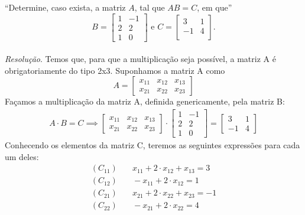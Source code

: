 \enquote{Determine, caso exista, a matriz $A$, tal que $AB = C$, em que}
\begin{displaymath}
B = \left[\begin{array}{ccc}
    1 & -1 \\
    2 & 2 \\
    1 & 0
\end{array} \right]
\text{ e }
C = \left[\begin{array}{cc}
    3 & 1 \\
    -1 & 4 \\
\end{array} \right].
\end{displaymath}
\\ 
\emph{Resolução}. Temos que, para que a multiplicação seja possível, a matriz A é obrigatoriamente do tipo 2x3. Suponhamos a matriz A como
\begin{displaymath}
A = \left[\begin{array}{ccc} 
	x_{11} & x_{12} & x_{13} \\
	x_{21} & x_{22} & x_{23} 
\end{array}\right]
\end{displaymath}
Façamos a multiplicação da matriz A, definida genericamente, pela matriz B:
\begin{align*}
    A \cdot B = C \implies 
    \left[\begin{array}{ccc} 
        x_{11} & x_{12} & x_{13} \\ 
        x_{21} & x_{22} & x_{23} 
    \end{array}\right] \cdot 
    \left[\begin{array}{cc} 
        1 & -1 \\
        2 & 2 \\ 
        1 & 0 
    \end{array}\right] =
    \left[\begin{array}{cc} 
        3 & 1 \\
        -1 & 4 
    \end{array} \right]
\end{align*}
Conhecendo os elementos da matriz C, teremos as seguintes expressões para cada um deles:
\begin{align*}
    (C_{11})& \quad x_{11} + 2\cdot x_{12} + x_{13} = 3 \\
    (C_{12})& \quad -x_{11} + 2\cdot x_{12} = 1  \\
    (C_{21})& \quad x_{21} + 2\cdot x_{22} + x_{23} = -1 \\
    (C_{22})& \quad -x_{21} + 2\cdot x_{22} = 4
\end{align*}
